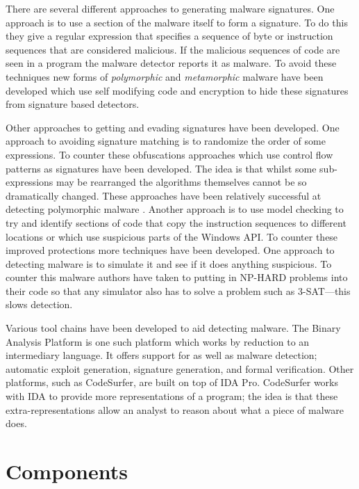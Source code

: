 \documentclass[10pt]{book}
\begin{document}
There are several different approaches to generating malware signatures.
One approach is to use a section of the malware itself to form a
signature. To do this they give a regular expression that specifies a
sequence of byte or instruction sequences that are considered malicious.
If the malicious sequences of code are seen in a program the malware
detector reports it as malware. To avoid these techniques new forms of
\emph{polymorphic} and \emph{metamorphic} malware have been developed
which use self modifying code and encryption to hide these signatures
from signature based detectors\autocite{Christodorescu:2005vf}.

Other approaches to getting and evading signatures have been developed.
One approach to avoiding signature matching is to randomize the order of
some
expressions\autocite{Borello:2008vx}\autocite{Christodorescu:2005vf}. To
counter these obfuscations approaches which use control flow patterns as
signatures have been developed\autocite{Bonfante:2007th}. The idea is
that whilst some sub-expressions may be rearranged the algorithms
themselves cannot be so dramatically changed. These approaches have been
relatively successful at detecting polymorphic malware
\autocite{Kang:2011bs}\autocite{Bruschi:vb}. Another approach is to use
model checking to try and identify sections of code that copy the
instruction sequences to different locations or which use suspicious
parts of the Windows API\autocite{Kinder:2005hu}. To counter these
improved protections more techniques have been developed. One approach
to detecting malware is to simulate it and see if it does anything
suspicious. To counter this malware authors have taken to putting in
NP-HARD problems into their code so that any simulator also has to solve
a problem such as 3-SAT\autocite{Moser:2007cd}---this slows detection.

Various tool chains have been developed to aid detecting malware. The
Binary Analysis Platform\autocite{Brumley:wn} is one such platform which
works by reduction to an intermediary language. It offers support for as
well as malware detection; automatic exploit
generation\autocite{Avgerinos:vo}, signature generation, and formal
verification. Other platforms, such as
CodeSurfer\autocite{Balakrishnan:2005tx}, are built on top of IDA
Pro\autocite{HexRays:up}. CodeSurfer works with IDA to provide more
representations of a program; the idea is that these
extra-representations allow an analyst to reason about what a piece of
malware does.

\chapter{Components}
\end{document}
